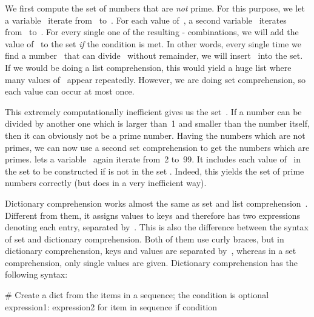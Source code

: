 We first compute the set of numbers that are \emph{not} prime.
For this purpose, we let a variable~ iterate from~ to~.
For each value of~, a second variable~ iterates from~ to~.
For every single one of the resulting \nobreakdashes- combinations, we will add the value of~ to the set \emph{if} the condition  is met.
In other words, every single time we find a number~ that can divide~ without remainder, we will insert~ into the set.
If we would be doing a list comprehension, this would yield a huge list where many values of~ appear repeatedly.
However, we are doing set comprehension, so each value can occur at most once.%
%
\begin{sloppypar}%
This extremely computationally inefficient gives us the set~.
If a number can be divided by another one which is larger than~1 and smaller than the number itself, then it can obviously not be a prime number.
Having the numbers which are not primes, we can now use a second set comprehension to get the numbers which are primes.
 lets a variable~ again iterate from~2 to~99.
It includes each value of~ in the set to be constructed if  is not in the set .
Indeed, this yields the set of prime numbers correctly (but does in a very inefficient way).%
\end{sloppypar}%
%
\FloatBarrier%
\endhsection%
%
%
%
Dictionary comprehension works almost the same as set and list comprehension~\cite{PEP274}.
Different from them, it assigns values to keys and therefore has two expressions denoting each entry, separated by~\pythonilIdx{:}.
This is also the difference between the syntax of set and dictionary comprehension.
Both of them use curly braces, but in dictionary comprehension, keys and values are separated by~\pythonilIdx{:}, whereas in a set comprehension, only single values are given.
Dictionary comprehension has the following syntax:%
%
\begin{pythonSyntax}
# Create a dict from the items in a sequence; the condition is optional
{expression1: expression2 for item in sequence if condition}
\end{pythonSyntax}
